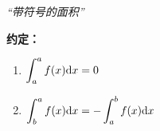 \begin{center}
	
	{\b\it “带符号的面积” }
\end{center}

{\bf 约定：}
\begin{enumerate}[(1)]
  \setlength{\itemindent}{1cm}
  \item $\displaystyle\int_a^af(x)\mathrm{d} x=0$
  \item $\displaystyle\int_b^af(x)\mathrm{d} x=-\displaystyle\int_a^bf(x)\mathrm{d} x$ 
\end{enumerate}

